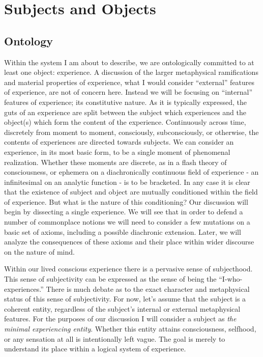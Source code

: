 \documentclass[leqno]{article}
\begin{document}
	\section{Subjects and Objects}

	\subsection{Ontology}

	Within the system I am about to describe, we are ontologically committed to at
	least one object: experience. A discussion of the larger metaphysical
	ramifications and material properties of experience, what I would consider \enquote{external}
	features of experience, are not of concern here. Instead we will be focusing
	on \enquote{internal} features of experience; its constitutive nature. As it is
	typically expressed, the guts of an experience are split between the subject
	which experiences and the object(s) which form the content of the experience.
	Continuously across time, discretely from moment to moment, consciously, subconsciously,
	or otherwise, the contents of experiences are directed towards subjects. We
	can consider an experience, in its most basic form, to be a single moment of
	phenomenal realization. Whether these moments are discrete, as in a flash
	theory of consciousness, or ephemera on a diachronically continuous field of experience
	- an infinitesimal on an analytic function - is to be bracketed. In any case
	it is clear that the existence of subject and object are mutually conditioned
	within the field of experience. But what is the nature of this conditioning?
	Our discussion will begin by dissecting a single experience. We will see that in
	order to defend a number of commonplace notions we will need to consider a few
	mutations on a basic set of axioms, including a possible diachronic extension.
	Later, we will analyze the consequences of these axioms and their place within
	wider discourse on the nature of mind.

	Within our lived conscious experience there is a pervasive sense of
	subjecthood. This sense of subjectivity can be expressed as the sense of being
	the \enquote{I-who-experiences.} There is much debate as to the exact
	character and metaphysical status of this sense of subjectivity. For now, let's
	assume that the subject is a coherent entity, regardless of the subject's internal
	or external metaphysical features. For the purposes of our discussion I will
	consider a subject as \emph{the minimal experiencing entity}. Whether this
	entity attains consciousness, selfhood, or any sensation at all is
	intentionally left vague. The goal is merely to understand its place within a logical
	system of experience.
\end{document}
